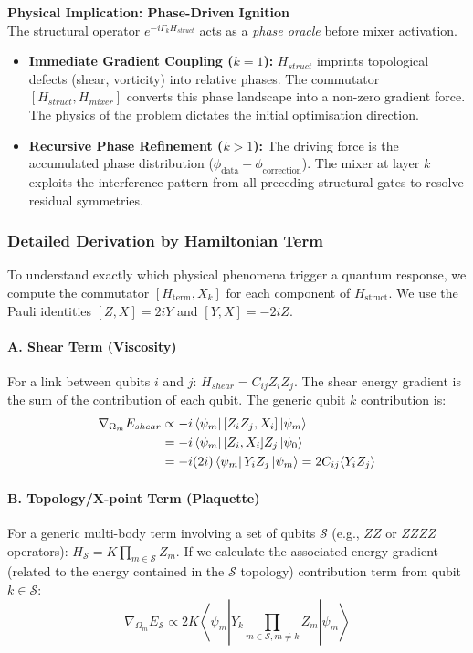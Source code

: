 \documentclass[12pt, a4paper, oneside]{report}
\begin{document}
\noindent\textbf{Physical Implication: Phase-Driven Ignition}\\
The structural operator $e^{-i\Gamma_k H_{struct}}$ acts as a \textit{phase oracle} before mixer activation.
\begin{itemize}
\item \textbf{Immediate Gradient Coupling ($k=1$):} $H_{struct}$ imprints topological defects (shear, vorticity) into relative phases. The commutator $[H_{struct}, H_{mixer}]$ converts this phase landscape into a non-zero gradient force. The physics of the problem dictates the initial optimisation direction.
\item \textbf{Recursive Phase Refinement ($k>1$):} The driving force is the accumulated phase distribution ($\phi_{\text{data}} + \phi_{\text{correction}}$). The mixer at layer $k$ exploits the interference pattern from all preceding structural gates to resolve residual symmetries.
\end{itemize}


\subsubsection{Detailed Derivation by Hamiltonian Term}
To understand exactly which physical phenomena trigger a quantum response, we compute the commutator $[H_{\text{term}}, X_k]$ for each component of $H_{\text{struct}}$. We use the Pauli identities $[Z, X] = 2iY$ and $[Y, X] = -2iZ$.

\paragraph{A. Shear Term (Viscosity)}
For a link between qubits $i$ and $j$: $H_{shear} = C_{ij} Z_i Z_j$. The shear energy gradient is the sum of the contribution of each qubit. The generic qubit $k$ contribution is: 
\begin{align}
    \nabla_{\Omega_m} E_{shear} &\propto -i \bra{\psi_m} [Z_i Z_j, X_i] \ket{\psi_m} \nonumber \\
    &= -i \bra{\psi_m} [Z_i, X_i] Z_j \ket{\psi_0} \nonumber \\
    &= -i (2i) \bra{\psi_m} Y_i Z_j \ket{\psi_m} = 2 C_{ij} \langle Y_i Z_j \rangle
\end{align}

\paragraph{B. Topology/X-point Term (Plaquette)}
For a generic multi-body term involving a set of qubits $\mathcal{S}$ (e.g., $ZZ$ or $ZZZZ$ operators): $H_{\mathcal{S}} = K \prod_{m \in \mathcal{S}} Z_m$.
If we calculate the associated energy gradient (related to the energy contained in the $\mathcal{S}$ topology) contribution term from qubit $k \in \mathcal{S}$:
\begin{equation}
    \nabla_{\Omega_m} E_{\mathcal{S}} \propto 2 K \left\langle \psi_m \left| Y_k \prod_{m \in \mathcal{S}, m \neq k} Z_m \right| \psi_m\right\rangle
\end{equation}
\end{document}
